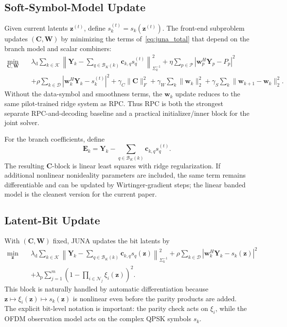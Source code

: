 \documentclass{wileysev}
\begin{document}
	\subsection{Soft-Symbol-Model Update}
	
	Given current latents \(\mathbf z^{(t)}\), define \(s_k^{(t)}=s_k(\mathbf z^{(t)})\). The front-end subproblem updates \((\mathbf C,\mathbf W)\) by minimizing the terms of~\eqref{eq:juna_total} that depend on the branch model and scalar combiners:
	\begin{equation}
		\begin{aligned}
			\min_{\mathbf C,\mathbf W}\quad
			&\lambda_{\mathrm d}
			\sum_{k\in\mathcal K}
			\left\|
			\mathbf Y_k-
			\sum_{q\in\mathcal B_K(k)}\mathbf c_{k,q}s_q^{(t)}
			\right\|_{\Sigma_k^{-1}}^2
			+\eta\sum_{p\in\mathcal P}|\mathbf w_p^H\mathbf Y_p-P_p|^2
			\\
			&+\rho\sum_{k\in\mathcal D}|\mathbf w_k^H\mathbf Y_k-s_k^{(t)}|^2
			+\gamma_C\|\mathbf C\|_F^2
			+\gamma_W\sum_k\|\mathbf w_k\|_2^2
			+\gamma_S\sum_k\|\mathbf w_{k+1}-\mathbf w_k\|_2^2 .
		\end{aligned}
		\label{eq:frontend_subproblem_juna}
	\end{equation}
	Without the data-symbol and smoothness terms, the \(\mathbf w_k\) update reduces to the same pilot-trained ridge system as RPC. Thus RPC is both the strongest separate RPC-and-decoding baseline and a practical initializer/inner block for the joint solver.
	
	For the branch coefficients, define
	\[
	\mathbf E_k
	=\mathbf Y_k-\sum_{q\in\mathcal B_K(k)}\mathbf c_{k,q}s_q^{(t)} .
	\]
	The resulting \(\mathbf C\)-block is linear least squares with ridge regularization. If additional nonlinear nonideality parameters are included, the same term remains differentiable and can be updated by Wirtinger-gradient steps; the linear banded model is the cleanest version for the current paper.
	
	\subsection{Latent-Bit Update}
	
	With \((\mathbf C,\mathbf W)\) fixed, JUNA updates the bit latents by
	\begin{equation}
		\begin{aligned}
			\min_{\mathbf z}\quad
			&\lambda_{\mathrm d}
			\sum_{k\in\mathcal K}
			\left\|
			\mathbf Y_k-
			\sum_{q\in\mathcal B_K(k)}\mathbf c_{k,q}s_q(\mathbf z)
			\right\|_{\Sigma_k^{-1}}^2
			+\rho\sum_{k\in\mathcal D}|\mathbf w_k^H\mathbf Y_k-s_k(\mathbf z)|^2
			\\
			&+\lambda_{\mathrm p}
			\sum_{j=1}^{m}
			\left(1-\prod_{i\in\mathcal N_j}\xi_i(\mathbf z)\right)^2 .
		\end{aligned}
		\label{eq:z_subproblem_juna}
	\end{equation}
	This block is naturally handled by automatic differentiation because \(\mathbf z\mapsto\xi_i(\mathbf z)\mapsto s_k(\mathbf z)\) is nonlinear even before the parity products are added. The explicit bit-level notation is important: the parity check acts on \(\xi_i\), while the OFDM observation model acts on the complex QPSK symbols \(s_k\).
	
\end{document}
